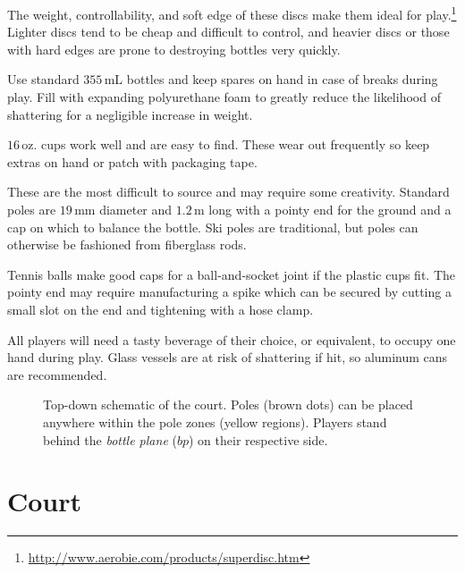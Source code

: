 \documentclass[11pt,letterpaper,twocolumn,english,DIV=calc]{scrartcl}
\begin{document}
\begin{description}[font=\large, leftmargin=0.5em]
	\item [{Aerobie® Superdisc™:}] 
		The weight, controllability, and soft edge of these discs make them ideal for play.\footnote{\url{http://www.aerobie.com/products/superdisc.htm}} 
		Lighter discs tend to be cheap and difficult to control, and heavier discs or those with hard edges are prone to destroying bottles very quickly. 
	\item [{Empty bottles (2):}] 
		Use standard $355\,\mbox{mL}$ bottles and keep spares on hand in case of breaks during play.
		Fill with expanding polyurethane foam to greatly reduce the likelihood of shattering for a negligible increase in weight. 
	\item [{Plastic cups (2):}] 
		$16\,\mbox{oz.}$ cups work well and are easy to find. 
		These wear out frequently so keep extras on hand or patch with packaging tape.
	\item [{Poles (2):}] 
		These are the most difficult to source and may require some creativity. 
		Standard poles are $19\,\mbox{mm}$ diameter and $1.2\,\mbox{m}$ long with a pointy end for the ground and a cap on which to balance the bottle. 
		Ski poles are traditional, but poles can otherwise be fashioned from fiberglass rods. 

		Tennis balls make good caps for a ball-and-socket joint if the plastic cups fit. 
		The pointy end may require manufacturing a spike which can be secured by cutting a small slot on the end and tightening with a hose clamp.
	\item [{Tasty~beverages:}] 
		All players will need a tasty beverage of their choice, or equivalent, to occupy one hand during play. 
		Glass vessels are at risk of shattering if hit, so aluminum cans are recommended. 
\end{description}

\begin{figure}[!ht]
	\begin{centering}
		\vspace{-5mm}\par
	\end{centering}
	\caption{
		Top-down schematic of the court. 
		Poles (brown dots) can be placed anywhere within the pole zones (yellow regions). 
		Players stand behind the \emph{bottle plane} ($bp$) on their respective side.\label{fig:court}
	}
\end{figure}


\part*{Court}%
\end{document}
